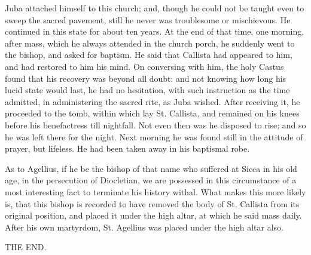 Juba attached himself to this church; and, though he could not be
taught even to sweep the sacred pavement, still he never was
troublesome or mischievous. He continued in this state for about ten
years. At the end of that time, one morning, after mass, which he
always attended in the church porch, he suddenly went to the bishop,
and asked for baptism. He said that Callista had appeared to
him, and had restored to him his mind. On conversing with him, the
holy Castus found that his recovery was beyond all doubt: and not
knowing how long his lucid state would last, he had no hesitation,
with such instruction as the time admitted, in administering the
sacred rite, as Juba wished. After receiving it, he proceeded to the
tomb, within which lay St. Callista, and remained on his knees before
his benefactress till nightfall. Not even then was he disposed to
rise; and so he was left there for the night. Next morning he was found
still in the attitude of prayer, but lifeless. He had been taken away
in his baptismal robe.

As to Agellius, if he be the bishop of that name who suffered at
Sicca in his old age, in the persecution of Diocletian, we are
possessed in this circumstance of a most interesting fact to terminate
his history withal. What makes this more likely is, that this bishop
is recorded to have removed the body of St. Callista from its original
position, and placed it under the high altar, at which he said mass
daily. After his own martyrdom, St. Agellius was placed under the high
altar also.

THE END.
